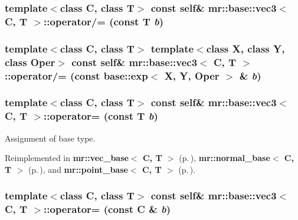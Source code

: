 \subsubsection{\setlength{\rightskip}{0pt plus 5cm}template$<$class C, class T$>$ const {\bf self}\& {\bf mr::base::vec3}$<$ C, T $>$::operator/= (const T {\em b})\hspace{0.3cm}{\tt  [inline]}}\label{structmr_1_1base_1_1vec3_z40_10}


\subsubsection{\setlength{\rightskip}{0pt plus 5cm}template$<$class C, class T$>$ template$<$class X, class Y, class Oper$>$ const {\bf self}\& {\bf mr::base::vec3}$<$ C, T $>$::operator/= (const {\bf base::exp}$<$ X, Y, Oper $>$ \& {\em b})\hspace{0.3cm}{\tt  [inline]}}\label{structmr_1_1base_1_1vec3_z40_9}


\subsubsection{\setlength{\rightskip}{0pt plus 5cm}template$<$class C, class T$>$ const {\bf self}\& {\bf mr::base::vec3}$<$ C, T $>$::operator= (const T {\em b})\hspace{0.3cm}{\tt  [inline]}}\label{structmr_1_1base_1_1vec3_z36_3}


Assignment of base type. 



Reimplemented in {\bf mr::vec\_\-base$<$ C, T $>$} {\rm (p.\,\pageref{structmr_1_1vec__base_z60_3})}, {\bf mr::normal\_\-base$<$ C, T $>$} {\rm (p.\,\pageref{structmr_1_1normal__base_z69_3})}, and {\bf mr::point\_\-base$<$ C, T $>$} {\rm (p.\,\pageref{structmr_1_1point__base_z77_3})}.
\subsubsection{\setlength{\rightskip}{0pt plus 5cm}template$<$class C, class T$>$ const {\bf self}\& {\bf mr::base::vec3}$<$ C, T $>$::operator= (const C \& {\em b})\hspace{0.3cm}{\tt  [inline]}}\label{structmr_1_1base_1_1vec3_z36_2}


